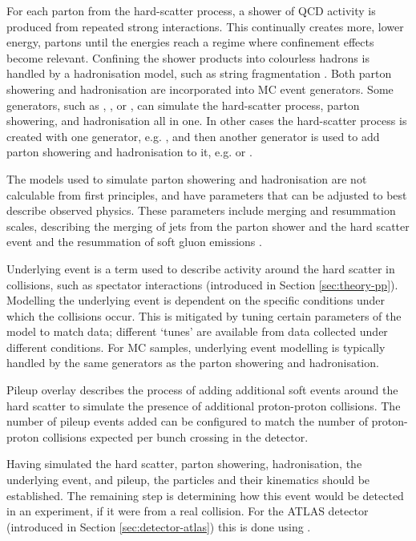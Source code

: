 For each parton from the hard-scatter process, a shower of \ac{QCD} activity is
produced from repeated strong interactions. This continually creates more, lower
energy, partons until the energies reach a regime where confinement effects
become relevant. Confining the shower products into colourless hadrons is
handled by a hadronisation model, such as string fragmentation
\cite{Andersson1983}. Both parton showering and hadronisation are incorporated
into \ac{MC} event generators. Some generators, such as \sherpa, \pythia, or
\herwig, can simulate the hard-scatter process, parton showering, and
hadronisation all in one. In other cases the hard-scatter process is created
with one generator, e.g.  \madgraph, and then another generator is used to add
parton showering and hadronisation to it, e.g. \pythia or \herwig.

The models used to simulate parton showering and hadronisation are not calculable from first
principles, and have parameters that can be adjusted to best describe observed
physics. These parameters include merging and resummation scales, describing the
merging of jets from the parton shower and the hard scatter event and the
resummation of soft gluon emissions \cite{sherpa2dot2}.

Underlying event is a term used to describe activity around the hard
scatter in collisions, such as spectator interactions
(introduced in Section \ref{sec:theory-pp}).
%
Modelling the underlying event is dependent on the specific conditions
under which the collisions occur. This is mitigated by tuning certain
parameters of the model to match data; different `tunes' are available from data
collected under different conditions. For \ac{MC} samples, underlying event
modelling is typically handled by the same generators as the parton showering
and hadronisation.

Pileup overlay describes the process of adding additional soft events around the
hard scatter to simulate the presence of additional proton-proton collisions.
The number of pileup events added can be configured to match the number of
proton-proton collisions expected per bunch crossing in the detector.

Having simulated the hard scatter, parton showering, hadronisation, the
underlying event, and pileup, the particles and their kinematics should be
established. The remaining step is determining how this event would be detected
in an experiment, if it were from a real collision. For the \acs{ATLAS} detector
(introduced in Section \ref{sec:detector-atlas}) this is done using \geantfour
\cite{geant4, ATLASsim1}.

